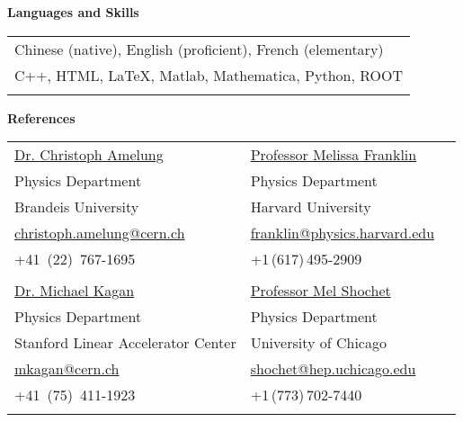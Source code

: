\documentclass[letterpaper,11pt,oneside]{article}
\begin{document}
 \raggedright
 \textbf{\Large{Languages and Skills}} \\
 \normalsize
 \begin{flushleft}
 \begin{tabular}{@{} l}
     Chinese (native), English (proficient), French (elementary)\\
     C++, HTML, \LaTeX, Matlab, Mathematica, Python, ROOT \\
     \\
      \end{tabular}
\end{flushleft}



\newpage
 \raggedright
 \textbf{\Large{References}} \\
 \normalsize
 \begin{flushleft}
\noindent \begin{tabular}{@{} l l l}
  \href{http://amelung.web.cern.ch/amelung/}{Dr. Christoph Amelung} 
  &\href{https://www.physics.harvard.edu/people/facpages/franklin}{Professor Melissa Franklin} \\
  Physics Department &  Physics Department  \\
  Brandeis University & Harvard University \\
  \small{\href{mailto:christoph.amelung@cern.ch}{christoph.amelung@cern.ch}}
  &\small{\href{mailto:franklin@physics.harvard.edu}{franklin@physics.harvard.edu}} \\ 
  +41\, (22)\, 767-1695 & +1\,(617)\,495-2909 \\ 
 & \\
  \href{http://www.slac.stanford.edu/exp/atlas/general/slac-personnel.html}{Dr. Michael Kagan}
  &\href{http://hep.uchicago.edu/cdf/shochet/mel_shochet.html}{Professor Mel Shochet}  \\
  Physics Department &  Physics Department  \\
  Stanford Linear Accelerator Center & University of Chicago \\
  \small{\href{mailto:mkagan@cern.ch }{mkagan@cern.ch}}
  &\small{\href{mailto:shochet@hep.uchicago.edu}{shochet@hep.uchicago.edu}} \\ 
  +41\, (75)\, 411-1923 & +1\,(773)\,702-7440 \\ 
 \hspace{0.5\linewidth} & \hspace{0.5\linewidth} \\
\end{tabular}
 \end{flushleft}


\clearpage
\end{document}
